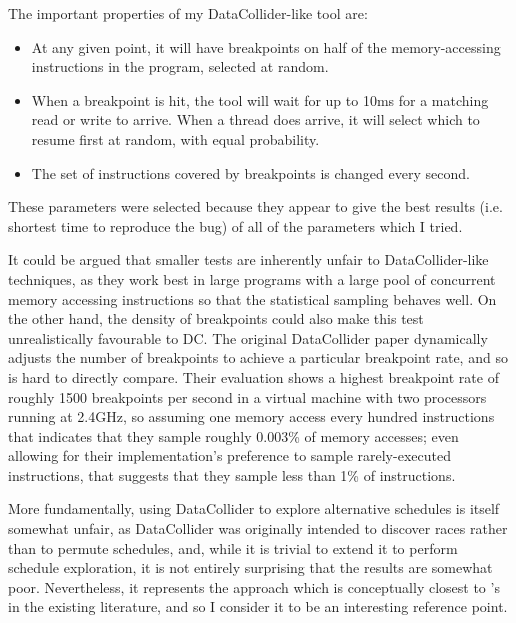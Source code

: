 The important properties of my DataCollider-like tool are:

\begin{itemize}
\item
  At any given point, it will have breakpoints on half of the
  memory-accessing instructions in the program, selected at random.
\item
  When a breakpoint is hit, the tool will wait for up to 10ms for a
  matching read or write to arrive.  When a thread does arrive, it
  will select which to resume first at random, with equal probability.
\item
  The set of instructions covered by breakpoints is changed every
  second.
\end{itemize}

These parameters were selected because they appear to give the best
results (i.e. shortest time to reproduce the bug) of all of the
parameters which I tried.  


It could be argued that smaller tests are inherently unfair to
DataCollider-like techniques, as they work best in large programs with
a large pool of concurrent memory accessing instructions so that the
statistical sampling behaves well.
On the other hand, the density of breakpoints could also make this
test unrealistically favourable to DC.  The original DataCollider
paper dynamically adjusts the number of breakpoints to achieve a
particular breakpoint rate, and so is hard to directly compare.  Their
evaluation shows a highest breakpoint rate of roughly 1500 breakpoints
per second in a virtual machine with two processors running at 2.4GHz,
so assuming one memory access every hundred instructions that
indicates that they sample roughly 0.003\% of memory accesses; even
allowing for their implementation's preference to sample
rarely-executed instructions, that suggests that they sample less than
1\% of instructions.

More fundamentally, using DataCollider to explore alternative
schedules is itself somewhat unfair, as DataCollider was originally
intended to discover races rather than to permute schedules, and,
while it is trivial to extend it to perform schedule exploration, it
is not entirely surprising that the results are somewhat poor.
Nevertheless, it represents the approach which is conceptually closest
to {\technique}'s in the existing literature, and so I consider it to
be an interesting reference point.

